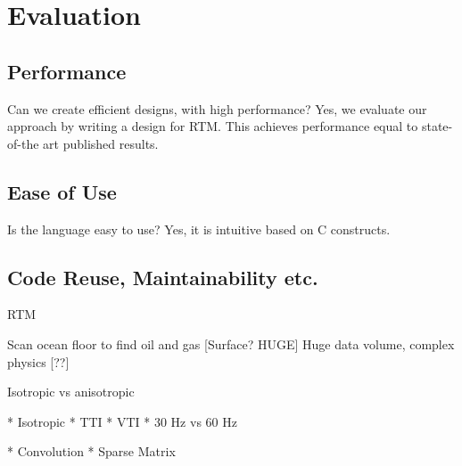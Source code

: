 \section{Evaluation}

\subsection{Performance}

Can we create efficient designs, with high performance?  Yes, we
evaluate our approach by writing a design for RTM. This achieves
performance equal to state-of-the art published results.

\subsection{Ease of Use}

Is the language easy to use?
Yes, it is intuitive based on C constructs.

\subsection{Code Reuse, Maintainability etc.}



RTM

Scan ocean floor to find oil and gas [Surface? HUGE]
Huge data volume, complex physics [??]

Isotropic vs anisotropic

* Isotropic
* TTI
* VTI
* 30 Hz vs 60 Hz

* Convolution
* Sparse Matrix
